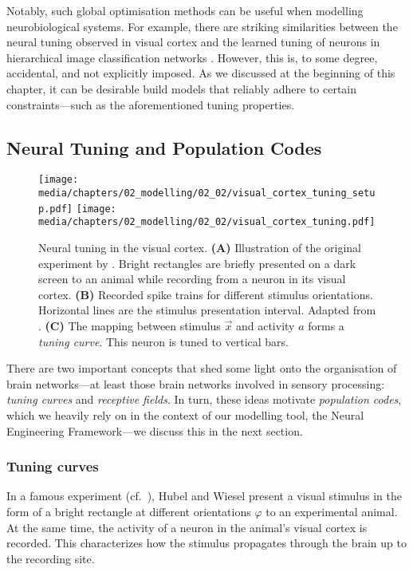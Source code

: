 Notably, such global optimisation methods can be useful when modelling neurobiological systems.
For example, there are striking similarities between the neural tuning observed in visual cortex and the learned tuning of neurons in hierarchical image classification networks \citep{yamins2016using}.
However, this is, to some degree, accidental, and not explicitly imposed.
As we discussed at the beginning of this chapter, it can be desirable build models that reliably adhere to certain constraints---such as the aforementioned tuning properties.

\subsection{Neural Tuning and Population Codes}
\label{sec:neural_tuning}

\begin{figure}
	\centering
	\texttt{[image: media/chapters/02\_modelling/02\_02/visual\_cortex\_tuning\_setup.pdf]}%
	\texttt{[image: media/chapters/02\_modelling/02\_02/visual\_cortex\_tuning.pdf]}
	\caption[Neural tuning in the visual cortex]{Neural tuning in the visual cortex.
	\textbf{(A)} Illustration of the original experiment by \citet{hubel1959receptive}. Bright rectangles are briefly presented on a dark screen to an animal while recording from a neuron in its visual cortex. \textbf{(B)} Recorded spike trains for different stimulus orientations. Horizontal lines are the stimulus presentation interval. Adapted from \citet[Figure~3]{hubel1959receptive}. \textbf{(C)} The mapping between stimulus $\vec x$ and activity $a$ forms a \emph{tuning curve}. This neuron is tuned to vertical bars.}
	\label{fig:visual_cortex_tuning}
\end{figure}

There are two important concepts that shed some light onto the organisation of brain networks---at least those brain networks involved in sensory processing: \emph{tuning curves} and \emph{receptive fields}.
In turn, these ideas motivate \emph{population codes}, which we heavily rely on in the context of our modelling tool, the Neural Engineering Framework---we discuss this in the next section.

\subsubsection{Tuning curves}
In a famous \citeyear{hubel1959receptive} experiment (cf.~), Hubel and Wiesel present a visual stimulus in the form of a bright rectangle at different orientations $\varphi$ to an experimental animal.
At the same time, the activity of a neuron in the animal's visual cortex is recorded.
This characterizes how the stimulus propagates through the brain up to the recording site.

